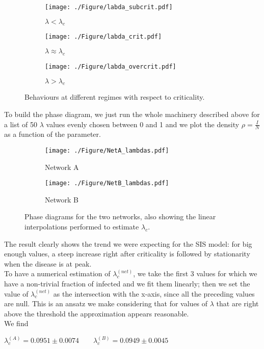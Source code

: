 \documentclass[a4paper,11pt]{article}
\begin{document}
\begin{figure}[htp]
\centering
\begin{subfigure}[b]{0.30\textwidth}
    \centering
    \texttt{[image: ./Figure/labda\_subcrit.pdf]}
    \caption{$\lambda < \lambda_{c}$}
    \label{fig:lambdacrit1}
\end{subfigure}
\begin{subfigure}[b]{.30\textwidth}
  \centering
  \texttt{[image: ./Figure/labda\_crit.pdf]}
  \caption{$\lambda \approx \lambda_{c}$}
  \label{fig:lambdacrit2}
\end{subfigure}%
\begin{subfigure}[b]{.30\textwidth}
  \centering
  \texttt{[image: ./Figure/labda\_overcrit.pdf]}
  \caption{$\lambda > \lambda_{c}$}
  \label{fig:lambdacrit3}
\end{subfigure}
\caption{Behaviours at different regimes with respect to criticality.}
\label{fig:lambdacrit}
\end{figure}

To build the phase diagram, we just run the whole machinery described above for a list of 50 $\lambda$ values evenly chosen between 0 and 1 and we plot the density $\rho = \frac{I}{N}$ as a function of the parameter.

\begin{figure}[htp]
  \centering
  \begin{subfigure}{.49\textwidth}
    \centering
    \texttt{[image: ./Figure/NetA\_lambdas.pdf]}  
  \caption{Network A}
  \label{fig:phaseA}
  \end{subfigure}
  \begin{subfigure}{.49\textwidth}
  \centering
  \texttt{[image: ./Figure/NetB\_lambdas.pdf]}  
  \caption{Network B}
  \label{fig:phaseB}
  \end{subfigure}
  \caption{Phase diagrams for the two networks, also showing the linear interpolations performed to estimate $\lambda_c$.}
  \label{fig:phase}
\end{figure}

The result clearly shows the trend we were expecting for the SIS model: for big enough values, a steep increase right after criticality is followed by stationarity when the disease is at peak.
\\
To have a numerical estimation of $\lambda_c^{(net)}$, we take the first 3 values for which we have a non-trivial fraction of infected and we fit them linearly; then we set the value of $\lambda_c^{(net)}$ as the intersection with the x-axis, since all the preceding values are null. This is an ansatz we make considering that for values of $\lambda$ that are right above the threshold the approximation appears reasonable.
\\
We find
\begin{center}
$\lambda_c^{(A)} = 0.0951 \pm 0.0074 \qquad \lambda_c^{(B)} = 0.0949 \pm 0.0045$
\end{center}
\end{document}
